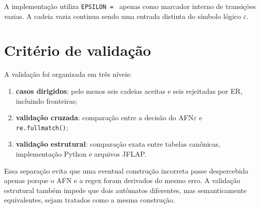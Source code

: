 A implementação utiliza \texttt{EPSILON = \textquotedbl{}\textquotedbl{}} apenas como marcador interno de transições vazias. A cadeia vazia continua sendo uma entrada distinta do símbolo lógico $\varepsilon$.

\section{Critério de validação}

A validação foi organizada em três níveis:

\begin{enumerate}
    \item \textbf{casos dirigidos}: pelo menos seis cadeias aceitas e seis rejeitadas por ER, incluindo fronteiras;
    \item \textbf{validação cruzada}: comparação entre a decisão do AFN$\varepsilon$ e \texttt{re.fullmatch()};
    \item \textbf{validação estrutural}: comparação exata entre tabelas canônicas, implementação Python e arquivos JFLAP.
\end{enumerate}

Essa separação evita que uma eventual construção incorreta passe despercebida apenas porque o AFN e a regex foram derivados do mesmo erro. A validação estrutural também impede que dois autômatos diferentes, mas semanticamente equivalentes, sejam tratados como a mesma construção.
